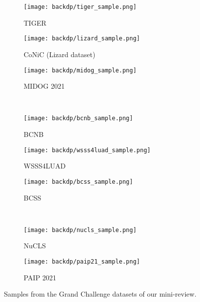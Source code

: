 \begin{figure}
  \centering
  \begin{subfigure}{0.30\textwidth}
    \centering
    \texttt{[image: backdp/tiger\_sample.png]}
    \caption{TIGER}
    \label{sfig:backdp:challenge_sample:tiger}
  \end{subfigure}
  \begin{subfigure}{0.30\textwidth}
    \centering
    \texttt{[image: backdp/lizard\_sample.png]}
    \caption{CoNiC (Lizard dataset)}
    \label{sfig:backdp:challenge_sample:conic}
  \end{subfigure} 
  \begin{subfigure}{0.30\textwidth}
    \centering
    \texttt{[image: backdp/midog\_sample.png]}
    \caption{MIDOG 2021}
    \label{sfig:backdp:challenge_sample:midog}
  \end{subfigure}\\

  \begin{subfigure}{0.30\textwidth}
    \centering
    \texttt{[image: backdp/bcnb\_sample.png]}
    \caption{BCNB}
    \label{sfig:backdp:challenge_sample:bcnb}
  \end{subfigure}
  \begin{subfigure}{0.30\textwidth}
    \centering
    \texttt{[image: backdp/wsss4luad\_sample.png]}
    \caption{WSSS4LUAD}
    \label{sfig:backdp:challenge_sample:wsss4luad}
  \end{subfigure}
  \begin{subfigure}{0.30\textwidth}
    \centering
    \texttt{[image: backdp/bcss\_sample.png]}
    \caption{BCSS}
    \label{sfig:backdp:challenge_sample:bcss}
  \end{subfigure} \\

  \begin{subfigure}{0.30\textwidth}
    \centering
    \texttt{[image: backdp/nucls\_sample.png]}
    \caption{NuCLS}
    \label{sfig:backdp:challenge_sample:nucls}
  \end{subfigure}
  \begin{subfigure}{0.48\textwidth}
    \centering
    \texttt{[image: backdp/paip21\_sample.png]}
    \caption{PAIP 2021}
    \label{sfig:backdp:challenge_sample:paip2021}
  \end{subfigure} 
  \caption{Samples from the Grand Challenge datasets of our mini-review.}
  \label{fig:backp:samples_challenges}
\end{figure}

